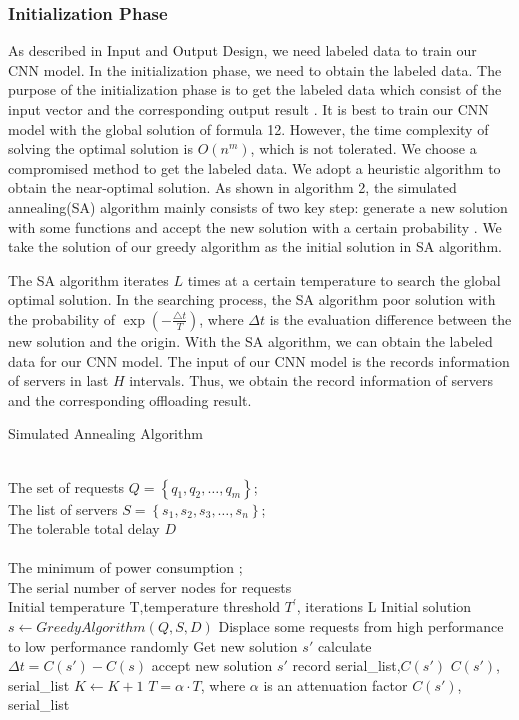 \documentclass[journal]{IEEEtran}
\begin{document}
\subsubsection{Initialization Phase}
As described in Input and Output Design, we need labeled data to train our CNN model. In the initialization phase, we need to obtain the labeled data. The purpose of the initialization phase is to get the labeled data which consist of the input vector and the corresponding output result \cite{20}. It is best to train our CNN model with the global solution of formula 12. However, the time complexity of solving the optimal solution is $O(n^m)$, which is not tolerated. We choose a compromised method to get the labeled data. We adopt a heuristic algorithm to obtain the near-optimal solution.  As shown in algorithm 2, the simulated annealing(SA) algorithm mainly consists of two key step: generate a new solution with some functions and accept the new solution with a certain probability \cite{21}. We take the solution of our greedy algorithm as the initial solution in SA algorithm.

The SA algorithm iterates $L$ times at a certain temperature to search the global optimal solution. In the searching process, the SA algorithm poor solution with the probability of $\exp(-\frac{\triangle t}{T})$, where $\Delta t$ is the evaluation difference between the new solution and the origin. With the SA algorithm, we can obtain the labeled data for our CNN model. The input of our CNN model is the records information of servers in last $H$ intervals. Thus, we obtain the record information of servers and the corresponding offloading result.

\begin{algorithm}[!h]   
\caption{Simulated Annealing Algorithm}   
\label{alg:Framwork}   
\begin{algorithmic}[1]
\REQUIRE ~~\\ %
The set of requests  $\mathit{Q}=\left\{q_1,q_2,\dots,q_m \right\} $;\\  
The list of servers $S=\left\{s_1,s_2,s_3,\dots,s_n \right\}$;\\ 
The tolerable total delay $D$ \\
\ENSURE ~~\\
The minimum of power consumption ;\\
The serial number of server nodes for requests \\ 
\STATE Initial temperature T,temperature threshold $T^{'}$, iterations L
\STATE Initial solution\\ $s \leftarrow Greedy  Algorithm(Q,S,D)$
\REPEAT
\STATE  Displace some requests from high performance to low performance randomly
\STATE Get new solution $s'$
\ENDIF
\STATE calculate $\Delta t = C(s')-C(s)$
\STATE accept new solution $s'$
\STATE record serial\_list,$C(s')$
\ENDIF
{}
\RETURN $C(s')$, serial\_list
\ENDIF
\STATE$K \leftarrow K+1$
\STATE $T = \alpha\cdot T$, where $\alpha$ is an attenuation factor
\ENDWHILE
\RETURN $C(s')$, serial\_list
\end{algorithmic}  
\end{algorithm}  
\end{document}
